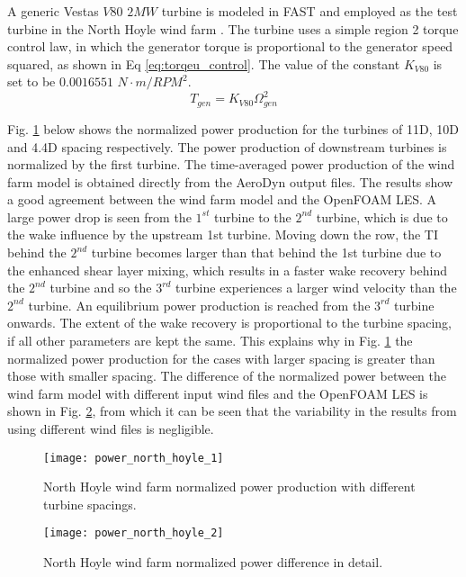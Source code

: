 \documentclass{umthesis}
\begin{document}
A generic Vestas $V80$ $2MW$ turbine is modeled in FAST and employed as the test turbine in the North Hoyle wind farm \cite{Churchfield_turbine}. The turbine uses a simple region 2 torque control law, in which the generator torque is proportional to the generator speed squared, as shown in Eq \ref{eq:torqeu_control}. The value of the constant $K_{V80}$ is set to be $0.0016551$ $N\cdot m/RPM^2$.
\begin{equation}\label{eq:torqeu_control}
  T_{gen}=K_{V80}\Omega _{gen}^2
\end{equation}

Fig. \ref{fig:power_north_hoyle_1} below shows the normalized power production for the turbines of 11D, 10D and 4.4D spacing respectively. The power production of downstream turbines is normalized by the first turbine. The time-averaged power production of the wind farm model is obtained directly from the AeroDyn output files. The results show a good agreement between the wind farm model and the OpenFOAM LES. A large power drop is seen from the $1^{st}$ turbine to the $2^{nd}$ turbine, which is due to the wake influence by the upstream 1st turbine. Moving down the row, the TI behind the $2^{nd}$ turbine becomes larger than that behind the 1st turbine due to the enhanced shear layer mixing, which results in a faster wake recovery behind the $2^{nd}$ turbine and so the $3^{rd}$ turbine experiences a larger wind velocity than the $2^{nd}$ turbine. An equilibrium power production is reached from the $3^{rd}$ turbine onwards. The extent of the wake recovery is proportional to the turbine spacing, if all other parameters are kept the same. This explains why in Fig. \ref{fig:power_north_hoyle_1} the normalized power production for the cases with larger spacing is greater than those with smaller spacing. The difference of the normalized power between the wind farm model with different input wind files and the OpenFOAM LES is shown in Fig. \ref{fig:power_north_hoyle_2}, from which it can be seen that the variability in the results from using different wind files is negligible.
\begin{figure}
  \centering
  \texttt{[image: power\_north\_hoyle\_1]}
  \caption{North Hoyle wind farm normalized power production with different turbine spacings.}\label{fig:power_north_hoyle_1}
\end{figure}

\begin{figure}
  \centering
  \texttt{[image: power\_north\_hoyle\_2]}
  \caption{North Hoyle wind farm normalized power difference in detail.}\label{fig:power_north_hoyle_2}
\end{figure}
\end{document}
